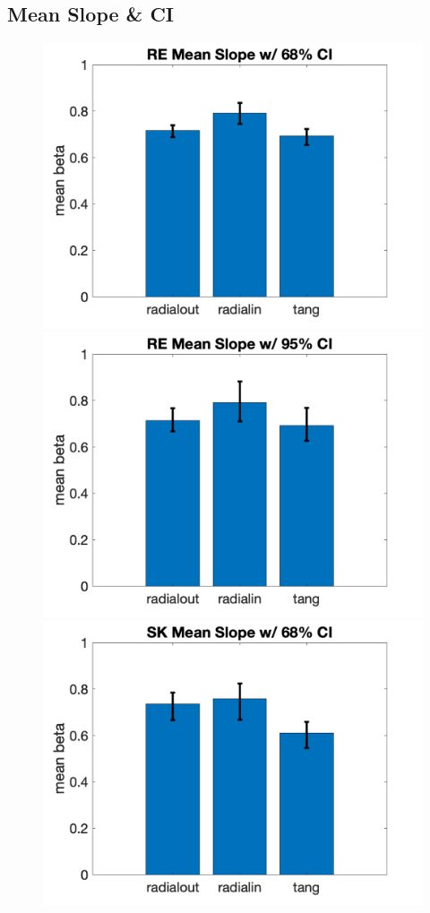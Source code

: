 \documentclass[11pt]{article} %
\begin{document}
\newpage
\subsection{Mean Slope \& CI}
\begin{figure}[H]
\centering %
\includegraphics[scale=.2]{Images/MeanSlopeError_68ci_RE.png}
\includegraphics[scale=.2]{Images/MeanSlopeError_95ci_RE.png}
\includegraphics[scale=.2]{Images/MeanSlopeError_68ci_SK.png}

\end{figure}
\end{document}

